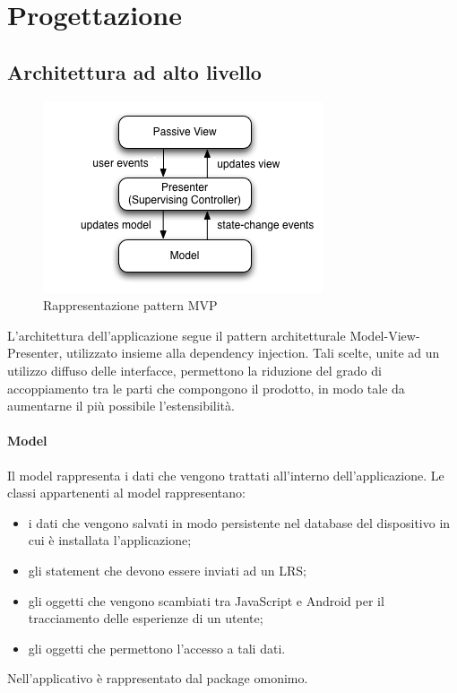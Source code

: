 \documentclass[../Tesi.tex]{subfiles}
\begin{document}
\section{Progettazione}\label{sec:progettazione}
	\subsection{Architettura ad alto livello}
		\begin{figure}[!h]
			\centering
			\includegraphics[scale=0.6]{images/mvp}
				\caption{Rappresentazione pattern MVP}
		\end{figure}

		L'architettura dell'applicazione segue il pattern architetturale Model-View-Presenter, utilizzato insieme alla dependency injection. Tali scelte, unite ad un utilizzo diffuso delle interfacce, permettono la riduzione del grado di accoppiamento tra le parti che compongono il prodotto, in modo tale da aumentarne il più possibile l'estensibilità.

		\paragraph*{Model}
		Il model rappresenta i dati che vengono trattati all'interno dell'applicazione. Le classi appartenenti al model rappresentano:
		\begin{itemize}
			\item i dati che vengono salvati in modo persistente nel database del dispositivo in cui è installata l'applicazione;
			\item gli statement che devono essere inviati ad un LRS;
			\item gli oggetti che vengono scambiati tra JavaScript e Android per il tracciamento delle esperienze di un utente;
			\item gli oggetti che permettono l'accesso a tali dati.
		\end{itemize}
		Nell'applicativo è rappresentato dal package omonimo.
\end{document}
